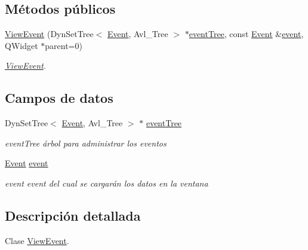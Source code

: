 \subsection*{Métodos públicos}
\begin{DoxyCompactItemize}
\item 
\hyperlink{class_view_event_a674c31c1f63107f55491087839be2e77}{View\+Event} (Dyn\+Set\+Tree$<$ \hyperlink{class_event}{Event}, Avl\+\_\+\+Tree $>$ $\ast$\hyperlink{class_view_event_a4a5575a712fa3139027258e5f2bb1201}{event\+Tree}, const \hyperlink{class_event}{Event} \&\hyperlink{class_view_event_a3a9469ca9e317bfc5bce5d9341d0b2a1}{event}, Q\+Widget $\ast$parent=0)
\begin{DoxyCompactList}\small\item\em \hyperlink{class_view_event}{View\+Event}. \end{DoxyCompactList}\end{DoxyCompactItemize}
\subsection*{Campos de datos}
\begin{DoxyCompactItemize}
\item 
Dyn\+Set\+Tree$<$ \hyperlink{class_event}{Event}, Avl\+\_\+\+Tree $>$ $\ast$ \hyperlink{class_view_event_a4a5575a712fa3139027258e5f2bb1201}{event\+Tree}\hypertarget{class_view_event_a4a5575a712fa3139027258e5f2bb1201}{}\label{class_view_event_a4a5575a712fa3139027258e5f2bb1201}

\begin{DoxyCompactList}\small\item\em event\+Tree árbol para administrar los eventos \end{DoxyCompactList}\item 
\hyperlink{class_event}{Event} \hyperlink{class_view_event_a3a9469ca9e317bfc5bce5d9341d0b2a1}{event}\hypertarget{class_view_event_a3a9469ca9e317bfc5bce5d9341d0b2a1}{}\label{class_view_event_a3a9469ca9e317bfc5bce5d9341d0b2a1}

\begin{DoxyCompactList}\small\item\em event event del cual se cargarán los datos en la ventana \end{DoxyCompactList}\end{DoxyCompactItemize}


\subsection{Descripción detallada}
Clase \hyperlink{class_view_event}{View\+Event}. 

